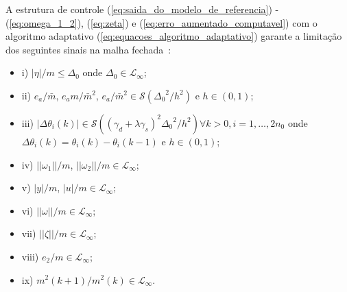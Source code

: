     \begin{teorema}
        A estrutura de controle (\ref{eq:saida_do_modelo_de_referencia}) - (\ref{eq:omega_1_2}),
        (\ref{eq:zeta}) e (\ref{eq:erro_aumentado_computavel}) com o algoritmo adaptativo
        (\ref{eq:equacoes_algoritmo_adaptativo}) garante a limitação dos seguintes sinais na malha
        fechada~\cite{ref:STEFANELLO}:

        \begin{itemize}
            \item[] i) $|\eta|/m \leq \Delta_0$ onde $\Delta_0 \in \mathcal{L}_{\infty}$;
            \item[] ii) $e_a/\bar{m}$, $e_am/{\bar{m}}^2$, $e_a/{\bar{m}}^2 \in \mathcal{S}
                \left( {\Delta_0}^2/h^2 \right)$ e $h \in (0, 1)$;
            \item[] iii) $|\Delta\theta_i(k)| \in \mathcal{S}\left(\left(\gamma_d + \lambda\gamma_s\right)^2
                {\Delta_0}^2/h^2 \right) \forall k > 0, i=1, \ldots, 2n_0$ onde $\Delta\theta_i(k) = \theta_i(k)
                - \theta_i(k-1)$ e $h \in (0, 1)$;
            \item[] iv) $||\omega_1||/m$, $||\omega_2||/m \in \mathcal{L}_{\infty}$;
            \item[] v) $|y|/m$, $|u|/m \in \mathcal{L}_{\infty}$;
            \item[] vi) $||\omega||/m \in \mathcal{L}_{\infty}$;
            \item[] vii) $||\zeta||/m \in \mathcal{L}_{\infty}$;
            \item[] viii) $e_2/m \in \mathcal{L}_{\infty}$;
            \item[] ix) $m^2(k+1)/m^2(k) \in \mathcal{L}_{\infty}$.
        \end{itemize}
    \end{teorema}



